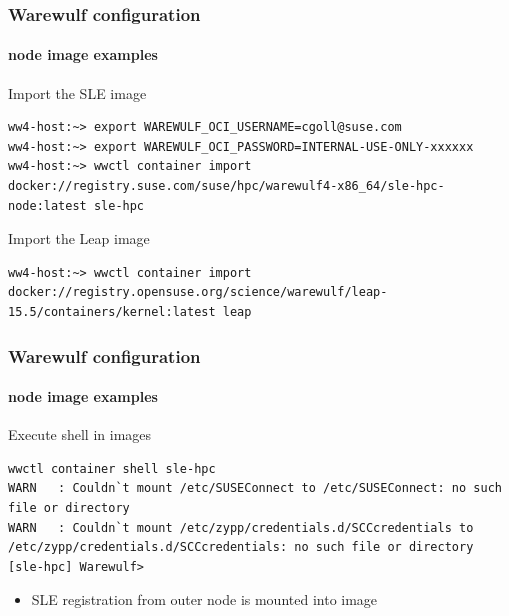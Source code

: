 \documentclass[aspectratio=169]{beamer}
\begin{document}
\begin{frame}[fragile]
\frametitle{Warewulf configuration}
\framesubtitle{node image examples}
\begin{block}{Import the SLE image}
\begin{lstlisting}[style=wwctl]
ww4-host:~> export WAREWULF_OCI_USERNAME=cgoll@suse.com
ww4-host:~> export WAREWULF_OCI_PASSWORD=INTERNAL-USE-ONLY-xxxxxx
ww4-host:~> wwctl container import docker://registry.suse.com/suse/hpc/warewulf4-x86_64/sle-hpc-node:latest sle-hpc
\end{lstlisting}
\end{block}
\begin{block}{Import the Leap image}
\begin{lstlisting}[style=wwctl]
ww4-host:~> wwctl container import docker://registry.opensuse.org/science/warewulf/leap-15.5/containers/kernel:latest leap
\end{lstlisting}
\end{block}
\end{frame}
\begin{frame}[fragile]
\frametitle{Warewulf configuration}
\framesubtitle{node image examples}
\begin{block}{Execute shell in images}
\begin{lstlisting}[style=wwctl]
wwctl container shell sle-hpc
WARN   : Couldn`t mount /etc/SUSEConnect to /etc/SUSEConnect: no such file or directory
WARN   : Couldn`t mount /etc/zypp/credentials.d/SCCcredentials to /etc/zypp/credentials.d/SCCcredentials: no such file or directory
[sle-hpc] Warewulf>
\end{lstlisting}
\begin{itemize}
  \item SLE registration from outer node is mounted into image
\end{itemize}
\end{block}
\end{frame}
\end{document}
